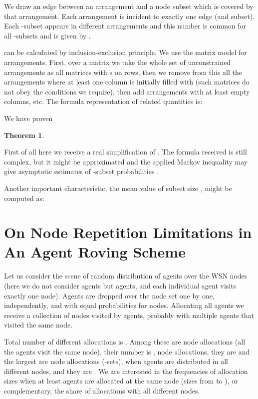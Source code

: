 \documentclass[conference]{IEEEtran}
\newtheorem{theorem}	{Theorem}
\begin{document}
We draw an edge between an arrangement and a node subset which is covered by that arrangement. Each arrangement is incident to exactly one edge (and subset). Each -subset appears in different arrangements and this number is common for all  -subsets and is given by .


 can be calculated by inclusion-exclusion principle. We use the matrix model for arrangements. First, over a  matrix we take the whole set of unconstrained arrangements as all matrices with  s on rows, then we remove from this all the arrangements where at least one column is initially filled with  (such matrices do not obey the conditions we require), then add arrangements with at least  empty columns, etc. The formula representation of related quantities is:


We have proven
\begin{theorem}

\end{theorem}

First of all here we receive a real simplification of . The formula received is still complex, but it might be approximated and the applied Markov inequality may give asymptotic estimates of  -subset probabilities \cite{medvedev}.

 
Another important characteristic, the mean value of subset size , might be computed as:



\section{On Node Repetition Limitations in An Agent Roving Scheme}

Let us consider the scene of random distribution of  agents over the  WSN nodes (here we do not consider  agents but  agents, and each individual agent visits exactly one node). Agents are dropped over the node set one by one, independently, and with equal probabilities for nodes. Allocating all  agents we receive a collection of nodes visited by agents, probably with multiple agents that visited the same node.


Total number of different allocations is . Among these are  node allocations (all the agents visit the same node), their number is ,  node allocations, they are  and the largest are  node allocations (-sets), when agents are distributed in all different nodes, and they are . We are interested in the frequencies of allocation sizes when at least  agents are allocated at the same node (sizes from  to ), or complementary, the share of allocations with all different nodes. 
\end{document}
